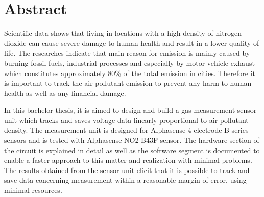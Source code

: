 \chapter*{Abstract}

Scientific data shows that living in locations with a high density of nitrogen dioxide can cause severe damage to human health and result in a lower quality of life. The researches indicate that main reason for  emission is mainly caused by burning fossil fuels, industrial processes and especially by motor vehicle exhaust which constitutes approximately 80\% of the total  emission in cities. Therefore it is important to track the air pollutant emission to prevent any harm to human health as well as any financial damage.\par 
In this bachelor thesis, it is aimed to design and build a gas measurement sensor unit which tracks and saves voltage data linearly proportional to air pollutant density. The measurement unit is designed for Alphasense 4-electrode B series sensors and is tested with Alphasense NO2-B43F sensor. The hardware section of the circuit is explained in detail as well as the software segment is documented to enable a faster approach to this matter and realization with minimal problems. The results obtained from the sensor unit elicit that it is possible to track and save data concerning  measurement within a reasonable margin of error, using minimal resources.     

